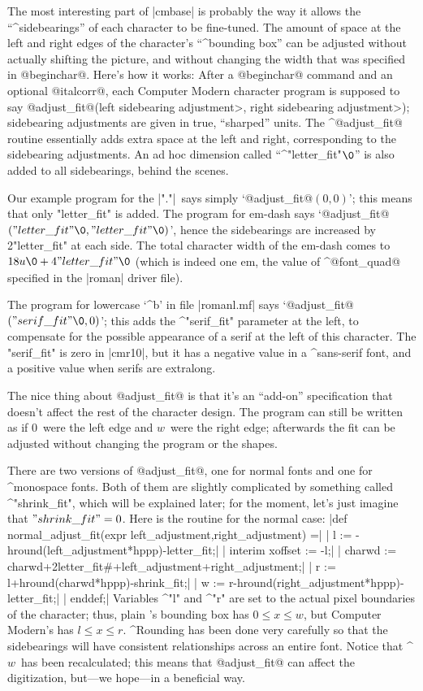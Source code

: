 The most interesting part of |cmbase| is probably the way it allows the
``^{side\-bearings}'' of each character to be fine-tuned. The amount of
space at the left and right edges of the character's ``^{bounding box}''
can be adjusted without actually shifting the picture, and without
changing the width that was specified in @beginchar@. Here's how it works:
After a @beginchar@ command and an optional @italcorr@, each Computer
Modern character program is supposed to say
\begindisplay
@adjust\_fit@(\<left sidebearing adjustment>,\thinspace
  \<right sidebearing adjustment>);
\enddisplay
sidebearing adjustments are given in true, ``sharped'' units.
The ^@adjust\_fit@ routine essentially adds extra space at the left
and right, corresponding to the sidebearing adjustments. An ad hoc
dimension called ``^"letter\_fit"$\0$'' is also added to all sidebearings,
behind the scenes.

Our example program for the |"."|\ says simply `@adjust\_fit@$(0,0)$';
this means that only "letter\_fit" is added. The program for em-dash
says `@adjust\_fit@$("letter\_fit"\0,\allowbreak"letter\_fit"\0)$', hence
the sidebearings are increased by 2"letter\_fit" at each side.
The total character width of the em-dash comes to $18u\0+
4"letter\_fit"\0$ (which is indeed one em, the value of ^@font\_quad@
specified in the |roman| driver file).

The program for lowercase `^{b}' in file |romanl.mf| says
`@adjust\_fit@$("serif\_fit"\0,0)$'; this adds the ^"serif\_fit"
parameter at the left, to compensate for the possible appearance
of a serif at the left of this character. The "serif\_fit" is
zero in |cmr10|, but it has a negative value in a ^{sans-serif} font,
and a positive value when serifs are extralong.

The nice thing about @adjust\_fit@ is that it's an ``add-on''
specification that doesn't affect the rest of the character design.
The program can still be written as if 0~were the left edge and
$w$~were the right edge; afterwards the fit can be adjusted without
changing the program or the shapes.

There are two versions of @adjust\_fit@, one for normal fonts
and one for ^{mono\-space} fonts. Both of them are slightly complicated
by something called ^"shrink\_fit", which will be explained later;
for the moment, let's just imagine that $"shrink\_fit"=0$. Here is the
routine for the normal case:
\beginlines
|def normal_adjust_fit(expr left_adjustment,right_adjustment) =|
| l := -hround(left_adjustment*hppp)-letter_fit;|
| interim xoffset := -l;|
| charwd := charwd+2letter_fit#+left_adjustment+right_adjustment;|
| r := l+hround(charwd*hppp)-shrink_fit;|
| w := r-hround(right_adjustment*hppp)-letter_fit;|
| enddef;|
\endlines
Variables ^"l" and ^"r" are set to the actual pixel boundaries of the
character; thus, plain \MF's bounding box has $0\le x\le w$, but
Computer Modern's has $l\le x\le r$. ^{Rounding} has been done
very carefully so that the sidebearings will have consistent
relationships across an entire font. Notice that ^{$w$}~has been
recalculated; this means that @adjust\_fit@ can affect the digitization,
but---we hope---in a beneficial way.

